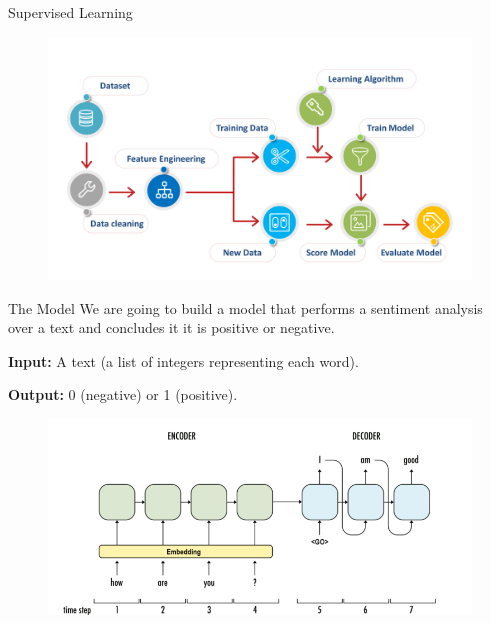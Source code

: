 \begin{frame}{Supervised Learning}
    \begin{figure}
        \includegraphics[width=\textwidth]{img/training-process.png}
    \end{figure}
\end{frame}

\begin{frame}{The Model}
    We are going to build a model that performs a sentiment analysis over a text and concludes it it is positive or negative.

    \textbf{Input:} A text (a list of integers representing each word).

    \textbf{Output:} 0 (negative) or 1 (positive).

    \begin{figure}
        \includegraphics[width=\textwidth]{img/lstm-model.png}
    \end{figure}
\end{frame}

